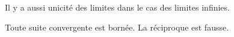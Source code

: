 \documentclass[french,11pt,twoside]{VcCours}
\begin{document}
\begin{Remarque}{} Il y a aussi unicité des limites dans le cas des limites infinies.
\end{Remarque}

\begin{Theoreme}{} Toute suite convergente est bornée. La réciproque est fausse.
\end{Theoreme}

\begin{Demonstration}{}
\vspace*{9.5cm}

\end{Demonstration}
%
%
%
%
%
%
\end{document}
